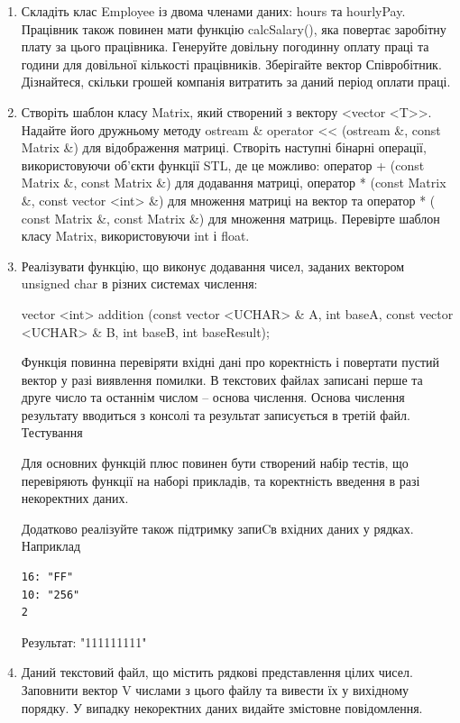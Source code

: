 \documentclass[a5paper,titlepage,openany,twoside,draft]{book_unv}%
\begin{document}
\begin{enumerate}
\item
  Складіть клас Employee із двома членами даних: hours та hourlyPay.
  Працівник також повинен мати функцію calcSalary(), яка повертає
  заробітну плату за цього працівника. Генеруйте довільну погодинну
  оплату праці та години для довільної кількості працівників. Зберігайте
  вектор Співробітник. Дізнайтеся, скільки
  грошей компанія витратить за даний період оплати праці.


\item
  Створіть шаблон класу Matrix, який створений з вектору
  \textless{}vector \textless{}T\textgreater{}\textgreater{}. Надайте
  його дружньому методу ostream \& operator \textless{}\textless{}
  (ostream \&, const Matrix \&) для відображення матриці. Створіть
  наступні бінарні операції, використовуючи об'єкти функції STL, де це
  можливо: оператор + (const Matrix \&, const Matrix \&) для додавання
  матриці, оператор * (const Matrix \&, const vector
  \textless{}int\textgreater{} \&) для множення матриці на вектор та
  оператор * ( const Matrix \&, const Matrix \&) для множення матриць.
  Перевірте шаблон класу Matrix, використовуючи int і float.

\item
Реалізувати функцію, що виконує додавання чисел, заданих вектором unsigned char
в різних системах числення: 

vector <int> addition (const vector <UCHAR> \& A, int baseA,
                      const vector <UCHAR> \& B, int baseB, int baseResult);

Функція повинна перевіряти вхідні дані про коректність і повертати пустий вектор у разі виявлення помилки.
В текстових файлах записані перше та друге число та останнім числом -- основа числення.
Основа числення результату вводиться з консолі та результат записується в третій файл.
Тестування

Для основних функцій плюс повинен бути створений набір тестів, що перевіряють функції на наборі прикладів, 
та коректність введення в разі некоректних даних. 

Додатково реалізуйте також підтримку запиCв вхідних даних у рядках. Наприклад
\begin{verbatim}
16: "FF"
10: "256"
2
\end{verbatim}
Результат:
"111111111" 

\item
Даний текстовий файл, що містить рядкові
представлення цілих чисел. Заповнити вектор V числами з цього файлу
та вивести їх у вихідному порядку. У випадку некоректних даних видайте
змістовне повідомлення.


\end{enumerate}
\end{document}

